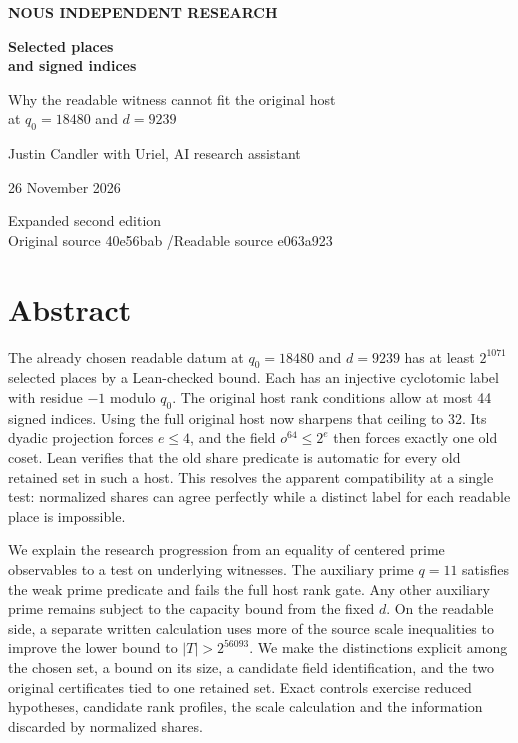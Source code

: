 \documentclass[12pt,letterpaper]{article}
\begin{document}
\thispagestyle{empty}
\begin{center}\vspace*{.5in}
{\sffamily\small\bfseries\color{accent}NOUS INDEPENDENT RESEARCH}\par\vspace{.55in}
{\fontsize{32}{38}\selectfont\bfseries\color{ink}Selected places\\and signed indices}\par\vspace{.25in}
{\Large Why the readable witness cannot fit the original host\\at $q_0=18480$ and $d=9239$}\par\vspace{.34in}
\par\vspace{.42in}
{\large Justin Candler with Uriel, AI research assistant}\par
26 November 2026
\end{center}\vfill
\begin{center}\small\sffamily Expanded second edition\\
Original source 40e56bab \enspace/\enspace Readable source e063a923\end{center}
\clearpage\section*{Abstract}
The already chosen readable datum at $q_0=18480$ and $d=9239$ has at least $2^{1071}$ selected places by a Lean-checked bound. Each has an injective cyclotomic label with residue $-1$ modulo $q_0$. The original host rank conditions allow at most 44 signed indices. Using the full original host now sharpens that ceiling to 32. Its dyadic projection forces $e\le4$, and the field $o^{64}\le2^e$ then forces exactly one old coset. Lean verifies that the old share predicate is automatic for every old retained set in such a host. This resolves the apparent compatibility at a single test: normalized shares can agree perfectly while a distinct label for each readable place is impossible.

We explain the research progression from an equality of centered prime observables to a test on underlying witnesses. The auxiliary prime $q=11$ satisfies the weak prime predicate and fails the full host rank gate. Any other auxiliary prime remains subject to the capacity bound from the fixed $d$. On the readable side, a separate written calculation uses more of the source scale inequalities to improve the lower bound to $|T|>2^{56093}$. We make the distinctions explicit among the chosen set, a bound on its size, a candidate field identification, and the two original certificates tied to one retained set. Exact controls exercise reduced hypotheses, candidate rank profiles, the scale calculation and the information discarded by normalized shares.
\end{document}
